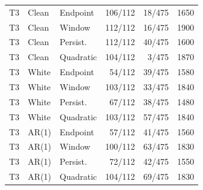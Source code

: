 \documentclass[10pt]{article}
\begin{document}
\begin{longtable}{lllrrr}
T3 & Clean & Endpoint & 106/112 & 18/475 & 1650 \\
T3 & Clean & Window & 112/112 & 16/475 & 1900 \\
T3 & Clean & Persist. & 112/112 & 40/475 & 1600 \\
T3 & Clean & Quadratic & 104/112 & 3/475 & 1870 \\
T3 & White & Endpoint & 54/112 & 39/475 & 1580 \\
T3 & White & Window & 103/112 & 33/475 & 1840 \\
T3 & White & Persist. & 67/112 & 38/475 & 1480 \\
T3 & White & Quadratic & 103/112 & 57/475 & 1840 \\
T3 & AR(1) & Endpoint & 57/112 & 41/475 & 1560 \\
T3 & AR(1) & Window & 100/112 & 63/475 & 1830 \\
T3 & AR(1) & Persist. & 72/112 & 42/475 & 1550 \\
T3 & AR(1) & Quadratic & 104/112 & 69/475 & 1830 \\
\bottomrule\end{longtable}\endgroup
\end{document}
